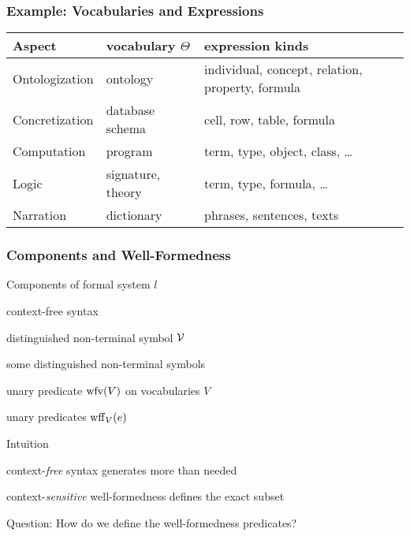 \begin{frame}\frametitle{Example: Vocabularies and Expressions}
\begin{center}
\footnotesize
\begin{tabular}{l|ll}
Aspect & vocabulary $\Theta$ & expression kinds \\
\hline
Ontologization  & ontology & individual, concept, relation, property, formula \\
Concretization & database schema & cell, row, table, formula \\
Computation & program & term, type, object, class, \ldots \\
Logic & signature, theory & term, type, formula, \ldots \\
Narration & dictionary & phrases, sentences, texts \\
\end{tabular}
\end{center}
\end{frame}


\begin{frame}\frametitle{Components and Well-Formedness}
\begin{blockitems}{Components of formal system $l$}
 \item context-free syntax
 \item distinguished non-terminal symbol $\mathcal{V}$ 
 \item some distinguished non-terminal symbols 
 \item unary predicate $\mathrm{wfv}(V)$ on vocabularies $V$ 
 \item unary predicates $\mathrm{wff}_{V}(e)$ 
\end{blockitems}

\begin{blockitems}{Intuition}
\item context-\emph{free} syntax generates more than needed
\item context-\emph{sensitive} well-formedness defines the exact subset
\end{blockitems}

Question: How do we define the well-formedness predicates?
\end{frame}

